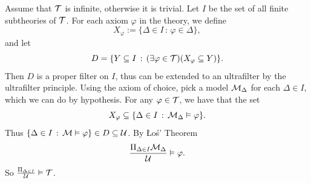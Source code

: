 \documentclass{article}
\numberwithin{thm}{subsection}
\begin{document}
\proof Assume that $\mathcal{T}$ is infinite, otherwise it is trivial. Let $I$ be the set of all finite subtheories of $\mathcal{T}$. For each axiom $\varphi$ in the theory, we define \[ X_{\varphi} := \{ \Delta \in I \, : \, \varphi \in \Delta\},\] and let \[ D = \{ Y \subseteq I \, : \, (\exists \varphi \in \mathcal{T})(X_{\varphi} \subseteq Y)\}.\] 
Then $D$ is a proper filter on $I$, thus can be extended to an ultrafilter by the ultrafilter principle. Using the axiom of choice, pick a model $\mathcal{M}_{\Delta}$ for each $\Delta \in I$, which we can do by hypothesis. 
For any $\varphi \in \mathcal{T}$, we have that the set \[X_{\varphi} \subseteq \{ \Delta \in I \, : \, \mathcal{M}_{\Delta} \vDash \varphi \}.\] Thus $\{ \Delta \in I \, : \, \mathcal{M} \vDash \varphi \} \in D \subseteq \mathcal{U}$. \gap By \L o\'s' Theorem \[ \frac{\Pi_{\Delta \in I} \mathcal{M}_{\Delta}}{\mathcal{U}} \vDash \varphi.\] So $\frac{\Pi_{\Delta \in I}}{\mathcal{U}} \vDash \mathcal{T}$.
\endproof
\end{document}
